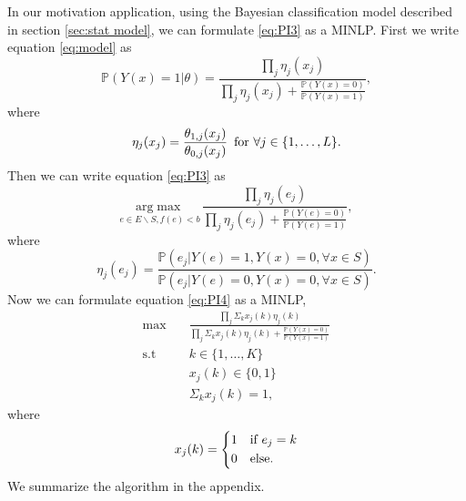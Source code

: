 \documentclass[12pt]{article}
\newcommand{\Prob}{\mathbb{P}}
\begin{document}
In our motivation application, using the Bayesian classification model described in section \ref{sec:stat model}, we can formulate \eqref{eq:PI3} as a MINLP. First we write equation \eqref{eq:model} as
\begin{equation} \label{model1}
\Prob\left(Y(x) = 1 | \theta\right) =
\frac{\prod_j \eta_j(x_j)}{\prod_j \eta_j(x_j) + \frac{\Prob(Y(x)=0)}{\Prob(Y(x)=1)}},
\end{equation}
where
\begin{equation*}
\eta_j(x_j) = \frac{\theta_{1,j}(x_j)}{\theta_{0,j}(x_j)} \text{\,\,\,for $\forall j \in \{1,\ldots,L\}$}. 
\end{equation*}
Then we can write equation \eqref{eq:PI3} as
\begin{equation} \label{eq:PI4}
\underset{e \in E \backslash S, f(e)<b}{\mathrm{arg}\max} \, \frac{\prod_j \eta_j(e_j)}{\prod_j \eta_j(e_j) + \frac{\Prob(Y(e)=0)}{\Prob(Y(e)=1)}},
\end{equation}
where 
\begin{equation*}
\eta_j(e_j)=\frac{\Prob(e_j|Y(e)=1,Y(x)=0, \forall x \in S)}{\Prob(e_j|Y(e)=0,Y(x)=0, \forall x \in S)}.
\end{equation*}
Now we can formulate equation \eqref{eq:PI4} as a MINLP,
\begin{equation} \label{eq:PI5}
\begin{split}
\max \quad &\frac{\prod_j \Sigma_k x_j(k) \eta_j(k)}{\prod_j \Sigma_k x_j(k) \eta_j(k) + \frac{\Prob(Y(x)=0)}{\Prob(Y(x)=1)}} \\
\text{s.t} \quad &k \in \{1,\ldots,K\} \\
&x_j(k) \in \{0,1\}\\
&\Sigma_k x_j(k)=1,
\end{split}
\end{equation}
where
\begin{equation*}
x_j(k)=\begin{dcases}
        1 & \text{if $e_j=k$}\\
        0 & \text{else}.
\end{dcases}
\end{equation*}
We summarize the algorithm in the appendix.
\end{document}
